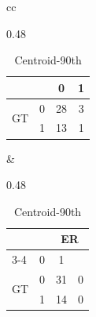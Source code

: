 \begin{table}[b]
\begin{tabular}{cc}
\begin{subtable}{0.48\columnwidth}
\begin{tabular}{|lc|cc|}
        \multicolumn{2}{|l|}{} & \multicolumn{1}{c|}{0} & \multicolumn{1}{c|}{1} \\ \hline
        \multicolumn{1}{|c|}{\multirow{2}{*}{GT}} & 0 & \multicolumn{1}{c|}{28} & 3 \\ \cline{2-4}
        \multicolumn{1}{|c|}{} & 1 & \multicolumn{1}{c|}{13} & 1 \\ \hline
      \end{tabular}
      \vspace{5pt}
    \end{subtable}
    &
    \begin{subtable}{0.48\columnwidth}
      \centering
      \caption{Centroid-90th}
      \label{matrix_xg_test_d}
      \scriptsize
      \begin{tabular}{|lc|cc|}
        \hline
        \multicolumn{2}{|l|}{\multirow{2}{*}{}} & \multicolumn{2}{c|}{ER} \\ \cline{3-4}
        \multicolumn{2}{|l|}{} & \multicolumn{1}{c|}{0} & \multicolumn{1}{c|}{1} \\ \hline
        \multicolumn{1}{|c|}{\multirow{2}{*}{GT}} & 0 & \multicolumn{1}{c|}{31} & 0 \\ \cline{2-4}
        \multicolumn{1}{|c|}{} & 1 & \multicolumn{1}{c|}{14} & 0 \\ \hline
      \end{tabular}
      \vspace{5pt}
    \end{subtable}
    \\
  \end{tabular}
\end{table}

